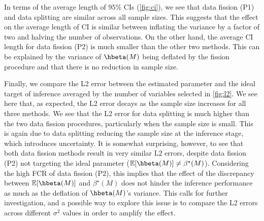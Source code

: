 In terms of the average length of $95\%$ CIs (\cref{fig:ci}), we see that data fission (P1) and data splitting are similar across all sample sizes. This suggests that the effect on the average length of CI is similar between inflating the variance by a factor of two and halving the number of observations. On the other hand, the average CI length for data fission (P2) is much smaller than the other two methods. This can be explained by the variance of $\hbeta(M)$ being deflated by the fission procedure and that there is no reduction in sample size.

Finally, we compare the L2 error between the estimated parameter and the ideal target of inference averaged by the number of variables selected in \cref{fig:l2}. We see here that, as expected, the L2 error decays as the sample size increases for all three methods. We see that the L2 error for data splitting is much higher than the two data fission procedures, particularly when the sample size is small. This is again due to data splitting reducing the sample size at the inference stage, which introduces uncertainty. It is somewhat surprising, however, to see that both data fission methods result in very similar L2 errors, despite data fission (P2) not targeting the ideal parameter ($\EE[\hbeta(M)] \neq \beta^\star(M)$). Considering the high FCR of data fission (P2), this implies that the effect of the discrepancy between $\EE[\hbeta(M)]$ and $\beta^\star(M)$ does not hinder the inference performance as much as the deflation of $\hbeta(M)$'s variance. This calls for further investigation, and a possible way to explore this issue is to compare the L2 errors across different $\sigma^2$ values in order to amplify the effect.